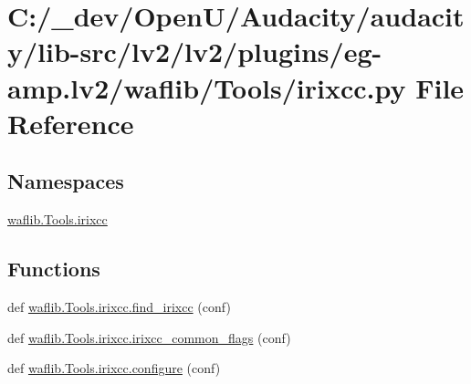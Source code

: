 \hypertarget{lv2_2plugins_2eg-amp_8lv2_2waflib_2_tools_2irixcc_8py}{}\section{C\+:/\+\_\+dev/\+Open\+U/\+Audacity/audacity/lib-\/src/lv2/lv2/plugins/eg-\/amp.lv2/waflib/\+Tools/irixcc.py File Reference}
\label{lv2_2plugins_2eg-amp_8lv2_2waflib_2_tools_2irixcc_8py}
\subsection*{Namespaces}
\begin{DoxyCompactItemize}
\item 
 \hyperlink{namespacewaflib_1_1_tools_1_1irixcc}{waflib.\+Tools.\+irixcc}
\end{DoxyCompactItemize}
\subsection*{Functions}
\begin{DoxyCompactItemize}
\item 
def \hyperlink{namespacewaflib_1_1_tools_1_1irixcc_a1b02ebdb6204ff3322531ba515fe187c}{waflib.\+Tools.\+irixcc.\+find\+\_\+irixcc} (conf)
\item 
def \hyperlink{namespacewaflib_1_1_tools_1_1irixcc_a636ab22dd5bfc5c90d23c109ff5c482f}{waflib.\+Tools.\+irixcc.\+irixcc\+\_\+common\+\_\+flags} (conf)
\item 
def \hyperlink{namespacewaflib_1_1_tools_1_1irixcc_a9f81cd5d34e60c61913d7de7bb9bd224}{waflib.\+Tools.\+irixcc.\+configure} (conf)
\end{DoxyCompactItemize}
